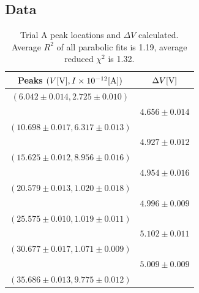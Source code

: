\documentclass[12pt]{article}
\begin{document}
\subsection*{Data}
\begin{table}[h!]
    \centering
        \caption{\centering Trial A peak locations and \(\Delta V\) calculated. Average $R^2$ of all parabolic fits is 1.19, average reduced $\chi^2$ is 1.32.}
    \begin{tabular}{cc}
        \toprule
        Peaks $(V [{\rm V}], I \times10^{-12}[{\rm A}])$ & $\Delta V{\rm [V]}$ \\
        \midrule
$(6.042 \pm 0.014, 2.725 \pm 0.010)$ & \\
& $4.656 \pm 0.014$ \\
$(10.698 \pm 0.017, 6.317 \pm 0.013)$ & \\
& $4.927 \pm 0.012$ \\
$(15.625 \pm 0.012, 8.956 \pm 0.016)$ & \\
& $4.954 \pm 0.016$ \\
$(20.579 \pm 0.013, 1.020 \pm 0.018)$ & \\
& $4.996 \pm 0.009$ \\
$(25.575 \pm 0.010, 1.019 \pm 0.011)$ & \\
& $5.102 \pm 0.011$ \\
$(30.677 \pm 0.017, 1.071 \pm 0.009)$ & \\
& $5.009 \pm 0.009$ \\
$(35.686 \pm 0.013, 9.775 \pm 0.012)$ & \\
        \bottomrule
    \end{tabular}
    \label{table:A_peaks}
\end{table}
\end{document}
